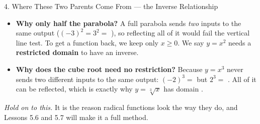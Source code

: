 \documentclass[10pt]{article}
\begin{document}
\begin{notesbox}{4. Where These Two Parents Come From --- the Inverse Relationship}
\begin{itemize}[leftmargin=1.5em, itemsep=3pt]
        $[0,\infty)$ because that is the  of $y=x^2$ --- a parabola never produces a
        negative output, so a square root never accepts a negative input.
  \item \textbf{Why only half the parabola?} A full parabola sends \emph{two} inputs to the same
        output ($(-3)^2=3^2=$ ), so reflecting all of it would fail the vertical line
        test. To get a function back, we keep only $x\ge 0$. We say $y=x^2$ needs a
        \textbf{restricted domain} to have an inverse.
  \item \textbf{Why does the cube root need no restriction?} Because $y=x^3$ never sends two
        different inputs to the same output: $(-2)^3=$  but $2^3=$ . All of
        it can be reflected, which is exactly why $y=\sqrt[3]{x}$ has domain .
\end{itemize}
\emph{Hold on to this.} It is the reason radical functions look the way they do, and Lessons 5.6 and
5.7 will make it a full method.
\end{notesbox}
\end{document}

